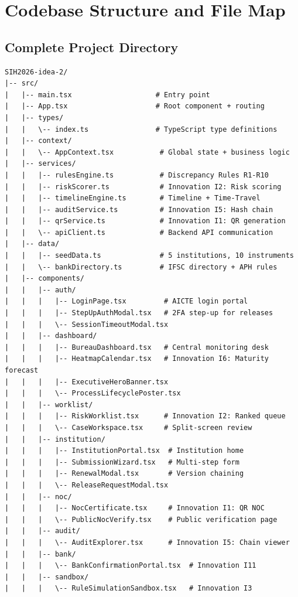 \documentclass[12pt, a4paper]{report}
\begin{document}
\chapter{Codebase Structure and File Map}

\section{Complete Project Directory}

\begin{verbatim}
SIH2026-idea-2/
|-- src/
|   |-- main.tsx                    # Entry point
|   |-- App.tsx                     # Root component + routing
|   |-- types/
|   |   \-- index.ts                # TypeScript type definitions
|   |-- context/
|   |   \-- AppContext.tsx           # Global state + business logic
|   |-- services/
|   |   |-- rulesEngine.ts           # Discrepancy Rules R1-R10
|   |   |-- riskScorer.ts            # Innovation I2: Risk scoring
|   |   |-- timelineEngine.ts        # Timeline + Time-Travel
|   |   |-- auditService.ts          # Innovation I5: Hash chain
|   |   |-- qrService.ts             # Innovation I1: QR generation
|   |   \-- apiClient.ts             # Backend API communication
|   |-- data/
|   |   |-- seedData.ts              # 5 institutions, 10 instruments
|   |   \-- bankDirectory.ts         # IFSC directory + APH rules
|   |-- components/
|   |   |-- auth/
|   |   |   |-- LoginPage.tsx         # AICTE login portal
|   |   |   |-- StepUpAuthModal.tsx   # 2FA step-up for releases
|   |   |   \-- SessionTimeoutModal.tsx
|   |   |-- dashboard/
|   |   |   |-- BureauDashboard.tsx   # Central monitoring desk
|   |   |   |-- HeatmapCalendar.tsx   # Innovation I6: Maturity forecast
|   |   |   |-- ExecutiveHeroBanner.tsx
|   |   |   \-- ProcessLifecyclePoster.tsx
|   |   |-- worklist/
|   |   |   |-- RiskWorklist.tsx      # Innovation I2: Ranked queue
|   |   |   \-- CaseWorkspace.tsx     # Split-screen review
|   |   |-- institution/
|   |   |   |-- InstitutionPortal.tsx  # Institution home
|   |   |   |-- SubmissionWizard.tsx   # Multi-step form
|   |   |   |-- RenewalModal.tsx       # Version chaining
|   |   |   \-- ReleaseRequestModal.tsx
|   |   |-- noc/
|   |   |   |-- NocCertificate.tsx     # Innovation I1: QR NOC
|   |   |   \-- PublicNocVerify.tsx    # Public verification page
|   |   |-- audit/
|   |   |   \-- AuditExplorer.tsx      # Innovation I5: Chain viewer
|   |   |-- bank/
|   |   |   \-- BankConfirmationPortal.tsx  # Innovation I11
|   |   |-- sandbox/
|   |   |   \-- RuleSimulationSandbox.tsx   # Innovation I3

\end{verbatim}
\end{document}
